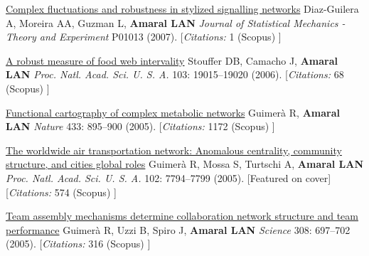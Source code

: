 \NumberedItem{\makebox[0.8cm][r]{[67]}}
\href{/people/amaral/complex-fluctuations-and-robustness-in-stylized-signalling-networks}
{Complex fluctuations and robustness in stylized signalling networks}
\newline
Diaz-Guilera A, Moreira AA, Guzman L, {\textbf{Amaral LAN}}
\newline
\textit{Journal of Statistical Mechanics - Theory and Experiment}
P01013 (2007).
    [{\em{Citations:}}  1 (Scopus) ]
\newline
\Gap
~
\Gap

\NumberedItem{\makebox[0.8cm][r]{[66]}}
\href{/people/amaral/a-robust-measure-of-food-web-intervality}
{A robust measure of food web intervality}
\newline
Stouffer DB, Camacho J, {\textbf{Amaral LAN}}
\newline
\textit{Proc. Natl. Acad. Sci. U. S. A.}
    103:
19015--19020 (2006).
    [{\em{Citations:}}  68 (Scopus) ]
\newline
\Gap
~
\Gap

\NumberedItem{\makebox[0.8cm][r]{[65]}}
\href{/people/amaral/functional-cartography-of-complex-metabolic-networks}
{Functional cartography of complex metabolic networks}
\newline
Guimer\`a R, {\textbf{Amaral LAN}}
\newline
\textit{Nature}
    433:
895--900 (2005).
    [{\em{Citations:}}  1172 (Scopus) ]
\newline
\Gap
~
\Gap

\NumberedItem{\makebox[0.8cm][r]{[64]}}
\href{/people/amaral/the-worldwide-air-transportation-network-anomalous-centrality-community-structure-and-cities-global-roles}
{The worldwide air transportation network: Anomalous centrality, community structure, and cities global roles}
\newline
Guimer\`a R, Mossa S, Turtschi A, {\textbf{Amaral LAN}}
\newline
\textit{Proc. Natl. Acad. Sci. U. S. A.}
    102:
7794--7799 (2005).
    [Featured on cover]
    [{\em{Citations:}}  574 (Scopus) ]
\newline
\Gap
~
\Gap

\NumberedItem{\makebox[0.8cm][r]{[63]}}
\href{/people/amaral/team-assembly-mechanisms-determine-collaboration-network-structure-and-team-performance}
{Team assembly mechanisms determine collaboration network structure and team performance}
\newline
Guimer\`a R, Uzzi B, Spiro J, {\textbf{Amaral LAN}}
\newline
\textit{Science}
    308:
697--702 (2005).
    [{\em{Citations:}}  316 (Scopus) ]
\newline
\Gap
~
\Gap

